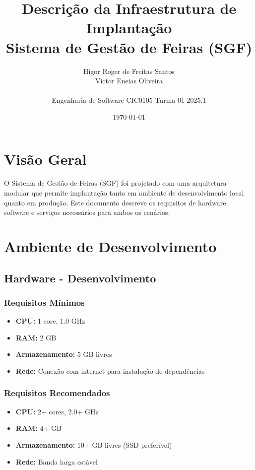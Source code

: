 \documentclass[12pt,a4paper]{article}
\title{\textbf{Descrição da Infraestrutura de Implantação}\\
\large Sistema de Gestão de Feiras (SGF)}
\author{Higor Roger de Freitas Santos \quad 221006440\\
Victor Eneias Oliveira \quad 221038364\\
\\
Engenharia de Software CIC0105 Turma 01 2025.1}
\date{\today}
\begin{document}
\maketitle
\tableofcontents
\newpage

\section{Visão Geral}

O Sistema de Gestão de Feiras (SGF) foi projetado com uma arquitetura modular que permite implantação tanto em ambiente de desenvolvimento local quanto em produção. Este documento descreve os requisitos de hardware, software e serviços necessários para ambos os cenários.

\section{Ambiente de Desenvolvimento}

\subsection{Hardware - Desenvolvimento}
\subsubsection{Requisitos Mínimos}
\begin{itemize}
    \item \textbf{CPU:} 1 core, 1.0 GHz
    \item \textbf{RAM:} 2 GB
    \item \textbf{Armazenamento:} 5 GB livres
    \item \textbf{Rede:} Conexão com internet para instalação de dependências
\end{itemize}

\subsubsection{Requisitos Recomendados}
\begin{itemize}
    \item \textbf{CPU:} 2+ cores, 2.0+ GHz
    \item \textbf{RAM:} 4+ GB
    \item \textbf{Armazenamento:} 10+ GB livres (SSD preferível)
    \item \textbf{Rede:} Banda larga estável
\end{itemize}
\end{document}
